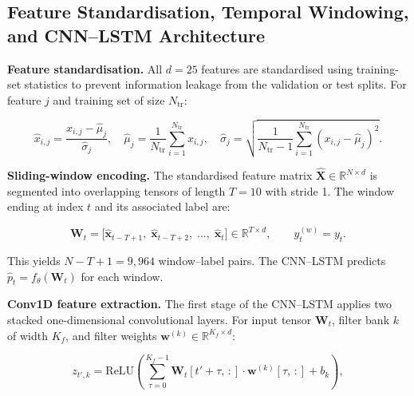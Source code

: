 \documentclass[sensors,article,submit,pdftex,moreauthors]{Definitions/mdpi}
\begin{document}
\subsection{Feature Standardisation, Temporal Windowing, and
CNN--LSTM Architecture}

\textbf{Feature standardisation.}
All $d = 25$ features are standardised using training-set
statistics to prevent information leakage from the validation or
test splits.
For feature $j$ and training set of size $N_\text{tr}$:

\begin{linenomath}
\begin{equation}
\hat{x}_{i,j} = \frac{x_{i,j} - \hat{\mu}_j}{\hat{\sigma}_j},
\quad
\hat{\mu}_j = \frac{1}{N_\text{tr}}\sum_{i=1}^{N_\text{tr}} x_{i,j},
\quad
\hat{\sigma}_j = \sqrt{\frac{1}{N_\text{tr}{-}1}
  \sum_{i=1}^{N_\text{tr}}(x_{i,j} - \hat{\mu}_j)^2}.
\label{eq:scaler}
\end{equation}
\end{linenomath}

\textbf{Sliding-window encoding.}
The standardised feature matrix
$\hat{\mathbf{X}} \in \mathbb{R}^{N \times d}$ is segmented into
overlapping tensors of length $T = 10$ with stride 1.
The window ending at index $t$ and its associated label are:

\begin{linenomath}
\begin{equation}
\mathbf{W}_t = \bigl[\hat{\mathbf{x}}_{t-T+1},\;
  \hat{\mathbf{x}}_{t-T+2},\;\ldots,\;
  \hat{\mathbf{x}}_{t}\bigr]
\in \mathbb{R}^{T \times d},
\qquad
y_t^{(w)} = y_t.
\label{eq:window}
\end{equation}
\end{linenomath}

\noindent This yields $N - T + 1 = 9{,}964$ window--label pairs.
The CNN--LSTM predicts $\hat{p}_t = f_\theta(\mathbf{W}_t)$ for
each window.

\textbf{Conv1D feature extraction.}
The first stage of the CNN--LSTM applies two stacked
one-dimensional convolutional layers.
For input tensor $\mathbf{W}_t$, filter bank $k$ of width $K_f$,
and filter weights $\mathbf{w}^{(k)} \in \mathbb{R}^{K_f \times d}$:

\begin{linenomath}
\begin{equation}
z_{t',k} = \text{ReLU}\!\left(
  \sum_{\tau=0}^{K_f-1} \mathbf{W}_t[t'+\tau,\,:]
  \cdot \mathbf{w}^{(k)}[\tau,\,:] + b_k
\right),
\label{eq:conv1d}
\end{equation}
\end{linenomath}
\end{document}
